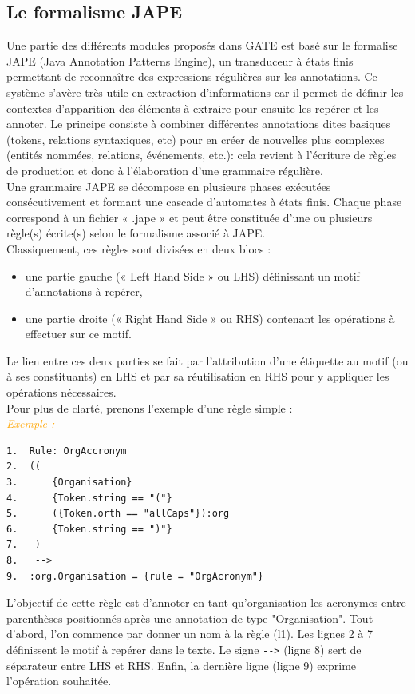 \documentclass[a4paper, 11pt]{report}
\newenvironment{exemple}
    {
    \textit{\textcolor{orange}{
    Exemple : \\}}
    }
    {~\\
    }
\begin{document}
\subsection{Le formalisme JAPE}
Une partie des différents modules proposés dans GATE est basé sur le formalise JAPE (Java Annotation Patterns Engine), un transduceur à états finis permettant de reconnaître des expressions régulières sur les annotations. Ce système s'avère très utile en extraction d'informations car il permet de définir les contextes d'apparition des éléments à extraire pour ensuite les repérer et les annoter. Le principe consiste à combiner différentes annotations dites basiques (tokens, relations syntaxiques, etc) pour en créer de nouvelles plus complexes (entités nommées, relations, événements, etc.): cela revient à l'écriture de règles de production et donc à l'élaboration d'une grammaire régulière.\\
Une grammaire JAPE se décompose en plusieurs phases exécutées consécutivement et formant une cascade d'automates à états finis. Chaque phase correspond à un fichier « .jape » et peut être constituée d'une ou plusieurs règle(s) écrite(s) selon le formalisme associé à JAPE.\cite{SL10}\\
Classiquement, ces règles sont divisées en deux blocs : 
\begin{itemize}
\item une partie gauche (« Left Hand Side » ou LHS) définissant un motif d'annotations à repérer,
\item une partie droite (« Right Hand Side » ou RHS) contenant les opérations à effectuer sur ce motif.
\end{itemize}
Le lien entre ces deux parties se fait par l'attribution d'une étiquette au motif (ou à ses constituants) en LHS et par sa réutilisation en RHS pour y appliquer les opérations nécessaires.\\
Pour plus de clarté, prenons l'exemple d'une règle simple :\\
\begin{exemple}
\begin{verbatim}
1.	Rule: OrgAccronym
2.	((
3.		{Organisation}
4.		{Token.string == "("}
5.		({Token.orth == "allCaps"}):org
6.		{Token.string == ")"}
7.	 )
8.	 -->
9.	:org.Organisation = {rule = "OrgAcronym"}
\end{verbatim}

L'objectif de cette règle est d'annoter en tant qu'organisation les acronymes entre parenthèses positionnés après une annotation de type "Organisation". Tout d'abord, l'on commence par donner un nom à la règle (l1). Les lignes 2 à 7 définissent le motif à repérer dans le texte. Le signe \verb|-->| (ligne 8) sert de séparateur entre LHS et RHS. Enfin, la dernière ligne (ligne 9) exprime l'opération souhaitée.
\end{exemple}
\end{document}
